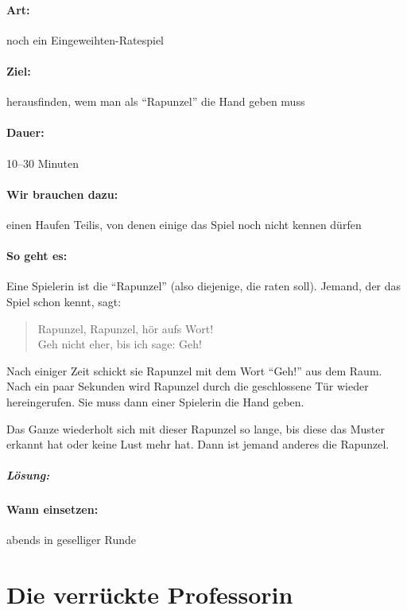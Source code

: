 \paragraph{Art:} noch ein Eingeweihten-Ratespiel
\paragraph{Ziel:} herausfinden, wem man als "`Rapunzel"' die Hand geben muss
\paragraph{Dauer:} 10--30 Minuten
\paragraph{Wir brauchen dazu:} einen Haufen Teilis, von denen einige das Spiel noch nicht kennen dürfen
\paragraph{So geht es:} Eine Spielerin ist die "`Rapunzel"' (also diejenige, die raten soll). Jemand, der das Spiel schon kennt, sagt:
  \begin{quote}
    Rapunzel, Rapunzel, hör aufs Wort!\\
    Geh nicht eher, bis ich sage: Geh!
  \end{quote}
Nach einiger Zeit schickt sie Rapunzel mit dem Wort "`Geh!"' aus dem Raum. Nach ein paar Sekunden wird Rapunzel durch die geschlossene Tür wieder hereingerufen. Sie muss dann einer Spielerin die Hand geben.

Das Ganze wiederholt sich mit dieser Rapunzel so lange, bis diese das Muster erkannt hat oder keine Lust mehr hat. Dann ist jemand anderes die Rapunzel.

\subparagraph{Lösung:}
\vspace{.5em}

\paragraph{Wann einsetzen:} abends in geselliger Runde

\section{Die verrückte Professorin}
